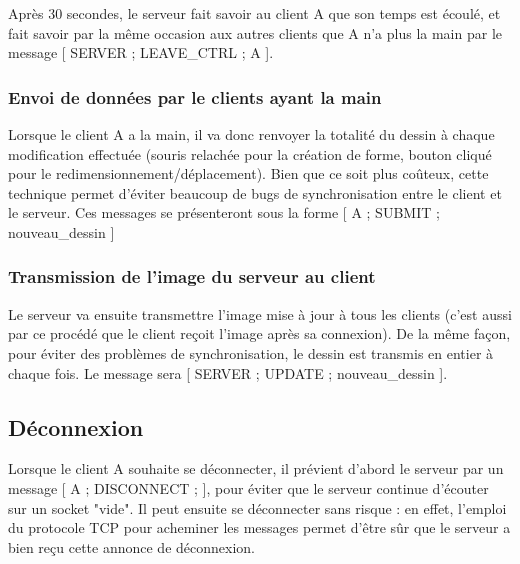 \documentclass[a4paper,10pt]{article}
\begin{document}
Après 30 secondes, le serveur fait savoir au client A que son temps est écoulé, et fait savoir par la même occasion aux autres clients que A n'a plus la main par le message [ SERVER ; LEAVE\_CTRL ; A ].

\subsubsection{Envoi de données par le clients ayant la main}
Lorsque le client A a la main, il va donc renvoyer la totalité du dessin à chaque modification effectuée (souris relachée pour la création de forme, bouton cliqué pour le redimensionnement/déplacement). Bien que ce soit plus coûteux, cette technique permet d'éviter beaucoup de bugs de synchronisation entre le client et le serveur. Ces messages se présenteront sous la forme [ A ; SUBMIT ; nouveau\_dessin ]

\subsubsection{Transmission de l'image du serveur au client}
Le serveur va ensuite transmettre l'image mise à jour à tous les clients (c'est aussi par ce procédé que le client reçoit l'image après sa connexion). De la même façon, pour éviter des problèmes de synchronisation, le dessin est transmis en entier à chaque fois. Le message sera [ SERVER ; UPDATE ; nouveau\_dessin ].

\subsection{Déconnexion}
Lorsque le client A souhaite se déconnecter, il prévient d'abord le serveur par un message [ A ; DISCONNECT ; ], pour éviter que le serveur continue d'écouter sur un socket "vide". Il peut ensuite se déconnecter sans risque : en effet, l'emploi du protocole TCP pour acheminer les messages permet d'être sûr que le serveur a bien reçu cette annonce de déconnexion.
\end{document}
